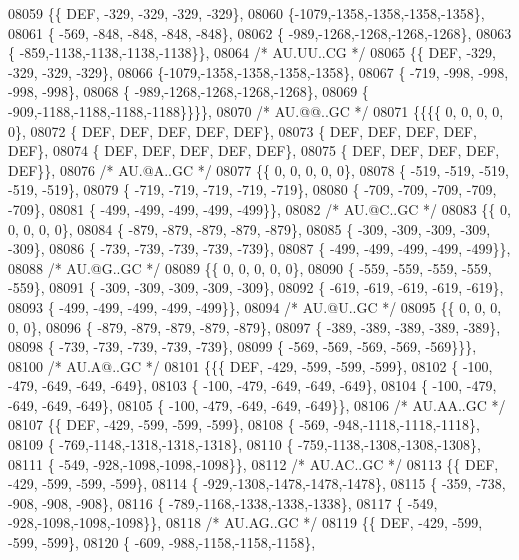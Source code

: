 \begin{DoxyCode}
08059 \{\{  DEF, -329, -329, -329, -329\},
08060 \{-1079,-1358,-1358,-1358,-1358\},
08061 \{ -569, -848, -848, -848, -848\},
08062 \{ -989,-1268,-1268,-1268,-1268\},
08063 \{ -859,-1138,-1138,-1138,-1138\}\},
08064 \textcolor{comment}{/* AU.UU..CG */}
08065 \{\{  DEF, -329, -329, -329, -329\},
08066 \{-1079,-1358,-1358,-1358,-1358\},
08067 \{ -719, -998, -998, -998, -998\},
08068 \{ -989,-1268,-1268,-1268,-1268\},
08069 \{ -909,-1188,-1188,-1188,-1188\}\}\}\},
08070 \textcolor{comment}{/* AU.@@..GC */}
08071 \{\{\{\{    0,    0,    0,    0,    0\},
08072 \{  DEF,  DEF,  DEF,  DEF,  DEF\},
08073 \{  DEF,  DEF,  DEF,  DEF,  DEF\},
08074 \{  DEF,  DEF,  DEF,  DEF,  DEF\},
08075 \{  DEF,  DEF,  DEF,  DEF,  DEF\}\},
08076 \textcolor{comment}{/* AU.@A..GC */}
08077 \{\{    0,    0,    0,    0,    0\},
08078 \{ -519, -519, -519, -519, -519\},
08079 \{ -719, -719, -719, -719, -719\},
08080 \{ -709, -709, -709, -709, -709\},
08081 \{ -499, -499, -499, -499, -499\}\},
08082 \textcolor{comment}{/* AU.@C..GC */}
08083 \{\{    0,    0,    0,    0,    0\},
08084 \{ -879, -879, -879, -879, -879\},
08085 \{ -309, -309, -309, -309, -309\},
08086 \{ -739, -739, -739, -739, -739\},
08087 \{ -499, -499, -499, -499, -499\}\},
08088 \textcolor{comment}{/* AU.@G..GC */}
08089 \{\{    0,    0,    0,    0,    0\},
08090 \{ -559, -559, -559, -559, -559\},
08091 \{ -309, -309, -309, -309, -309\},
08092 \{ -619, -619, -619, -619, -619\},
08093 \{ -499, -499, -499, -499, -499\}\},
08094 \textcolor{comment}{/* AU.@U..GC */}
08095 \{\{    0,    0,    0,    0,    0\},
08096 \{ -879, -879, -879, -879, -879\},
08097 \{ -389, -389, -389, -389, -389\},
08098 \{ -739, -739, -739, -739, -739\},
08099 \{ -569, -569, -569, -569, -569\}\}\},
08100 \textcolor{comment}{/* AU.A@..GC */}
08101 \{\{\{  DEF, -429, -599, -599, -599\},
08102 \{ -100, -479, -649, -649, -649\},
08103 \{ -100, -479, -649, -649, -649\},
08104 \{ -100, -479, -649, -649, -649\},
08105 \{ -100, -479, -649, -649, -649\}\},
08106 \textcolor{comment}{/* AU.AA..GC */}
08107 \{\{  DEF, -429, -599, -599, -599\},
08108 \{ -569, -948,-1118,-1118,-1118\},
08109 \{ -769,-1148,-1318,-1318,-1318\},
08110 \{ -759,-1138,-1308,-1308,-1308\},
08111 \{ -549, -928,-1098,-1098,-1098\}\},
08112 \textcolor{comment}{/* AU.AC..GC */}
08113 \{\{  DEF, -429, -599, -599, -599\},
08114 \{ -929,-1308,-1478,-1478,-1478\},
08115 \{ -359, -738, -908, -908, -908\},
08116 \{ -789,-1168,-1338,-1338,-1338\},
08117 \{ -549, -928,-1098,-1098,-1098\}\},
08118 \textcolor{comment}{/* AU.AG..GC */}
08119 \{\{  DEF, -429, -599, -599, -599\},
08120 \{ -609, -988,-1158,-1158,-1158\},

\end{DoxyCode}
